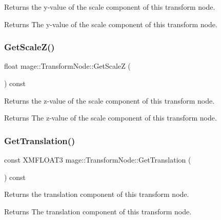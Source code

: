 Returns the y-\/value of the scale component of this transform node.

\begin{DoxyReturn}{Returns}
The y-\/value of the scale component of this transform node. 
\end{DoxyReturn}
\hypertarget{classmage_1_1_transform_node_afba2781f69e1abe50b9a2ad87f641439}{}\label{classmage_1_1_transform_node_afba2781f69e1abe50b9a2ad87f641439} 
\subsubsection{\texorpdfstring{Get\+Scale\+Z()}{GetScaleZ()}}
{\footnotesize\ttfamily float mage\+::\+Transform\+Node\+::\+Get\+ScaleZ (\begin{DoxyParamCaption}{ }\end{DoxyParamCaption}) const}

Returns the z-\/value of the scale component of this transform node.

\begin{DoxyReturn}{Returns}
The z-\/value of the scale component of this transform node. 
\end{DoxyReturn}
\hypertarget{classmage_1_1_transform_node_a827c4ea5520141eb50866283acef95ad}{}\label{classmage_1_1_transform_node_a827c4ea5520141eb50866283acef95ad} 
\subsubsection{\texorpdfstring{Get\+Translation()}{GetTranslation()}}
{\footnotesize\ttfamily const X\+M\+F\+L\+O\+A\+T3 mage\+::\+Transform\+Node\+::\+Get\+Translation (\begin{DoxyParamCaption}{ }\end{DoxyParamCaption}) const}

Returns the translation component of this transform node.

\begin{DoxyReturn}{Returns}
The translation component of this transform node. 
\end{DoxyReturn}
\hypertarget{classmage_1_1_transform_node_a31b8818a43af8633136f345e30572723}{}\label{classmage_1_1_transform_node_a31b8818a43af8633136f345e30572723} 
